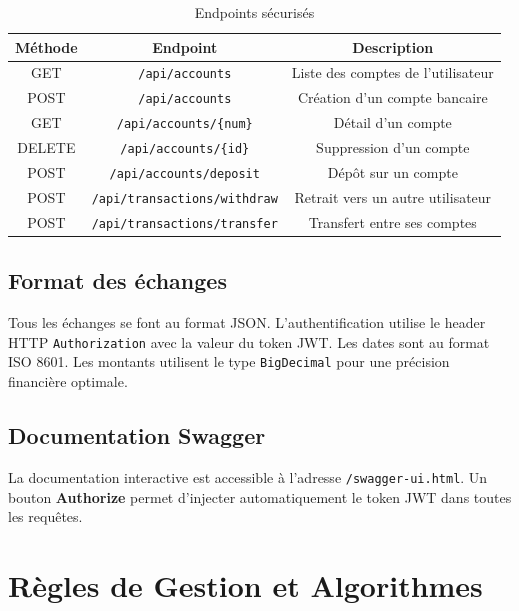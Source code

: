 \documentclass[12pt,a4paper]{article}
\newcommand{\tableheader}[1]{\textbf{#1}}
\begin{document}
\begin{table}[H]
    \centering
    \renewcommand{\arraystretch}{1.3}
    \begin{tabular}{|c|c|c|}
        \hline
        \tableheader{Méthode} & \tableheader{Endpoint} & \tableheader{Description} \\
        \hline
        GET & \texttt{/api/accounts} & Liste des comptes de l'utilisateur \\
        \hline
        POST & \texttt{/api/accounts} & Création d'un compte bancaire \\
        \hline
        GET & \texttt{/api/accounts/\{num\}} & Détail d'un compte \\
        \hline
        DELETE & \texttt{/api/accounts/\{id\}} & Suppression d'un compte \\
        \hline
        POST & \texttt{/api/accounts/deposit} & Dépôt sur un compte \\
        \hline
        POST & \texttt{/api/transactions/withdraw} & Retrait vers un autre utilisateur \\
        \hline
        POST & \texttt{/api/transactions/transfer} & Transfert entre ses comptes \\
        \hline
    \end{tabular}
    \caption{Endpoints sécurisés}
\end{table}

\subsection{Format des échanges}
Tous les échanges se font au format JSON. L'authentification utilise le header HTTP \texttt{Authorization} avec la valeur du token JWT. Les dates sont au format ISO 8601. Les montants utilisent le type \texttt{BigDecimal} pour une précision financière optimale.

\subsection{Documentation Swagger}
La documentation interactive est accessible à l'adresse \texttt{/swagger-ui.html}. Un bouton \textbf{Authorize} permet d'injecter automatiquement le token JWT dans toutes les requêtes.

\section{Règles de Gestion et Algorithmes}
\end{document}
